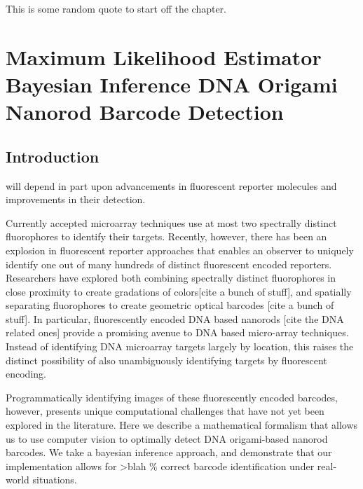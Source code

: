 %

\begin{savequote}[75mm] 
This is some random quote to start off the chapter.
\end{savequote}

\chapter{Maximum Likelihood Estimator Bayesian Inference DNA Origami  Nanorod Barcode Detection} \label{chapter:DNAtheory}

\section{Introduction}
 will depend in part upon advancements in fluorescent reporter molecules and improvements in their detection.

Currently accepted microarray techniques  use at most two spectrally distinct fluorophores to identify their targets.  Recently, however, there has been an explosion in fluorescent reporter approaches that enables an observer to uniquely identify one out of many hundreds of distinct fluorescent encoded reporters. Researchers have explored both combining spectrally distinct fluorophores in close proximity to create gradations of colors[cite a bunch of stuff], and spatially separating fluorophores to create geometric optical barcodes [cite a bunch of stuff]. In particular, fluorescently encoded DNA based nanorods [cite the DNA related ones] provide a promising avenue to DNA based micro-array techniques. Instead of identifying DNA microarray targets largely by location, this raises the distinct possibility of also unambiguously identifying targets by fluorescent encoding. 

Programmatically identifying images of these fluorescently encoded barcodes, however, presents unique computational challenges that have not yet been explored in the literature.  Here we describe a mathematical formalism that allows us to use computer vision to optimally detect DNA origami-based nanorod barcodes. We take a bayesian inference approach, and demonstrate that our implementation allows for >blah \% correct barcode identification under real-world situations. 


